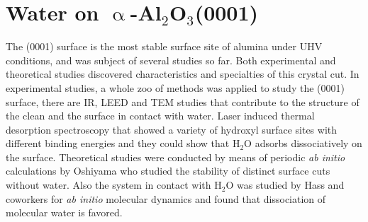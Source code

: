 \documentclass[11pt,DIV=13,BCOR=5mm,a4paper,headinclude]{scrbook}
\begin{document}
% 


\chapter{Water on $\upalpha$-Al$_2$O$_3$(0001)}\label{sec:0001}
The (0001) surface is the most stable surface site of alumina under UHV conditions, and was subject of several studies so far\cite{kuri10,hass98,hass00,Elam1998,Brown1999,Kelber2007}.
Both experimental and theoretical studies discovered characteristics and specialties of this crystal cut.
In experimental studies, a whole zoo of methods was applied to study the (0001) surface, there are IR\cite{Tsyganenko1996}, LEED\cite{Chang1971} and TEM\cite{Lee1985} studies that contribute to the structure of the clean and the surface in contact with water.
Laser induced thermal desorption spectroscopy\cite{Elam1998,Nelson1998} that showed a variety of hydroxyl surface sites with different binding energies and they could show that H$_2$O adsorbs dissociatively on the surface.
Theoretical studies were conducted by means of periodic \textit{ab initio} calculations by Oshiyama\cite{kuri10} who studied the stability of distinct surface cuts without water. Also the system in contact with H$_2$O was studied by Hass and coworkers\cite{hass98,hass00} for \textit{ab initio} molecular dynamics and found that dissociation of molecular water is favored.
\\
\end{document}
